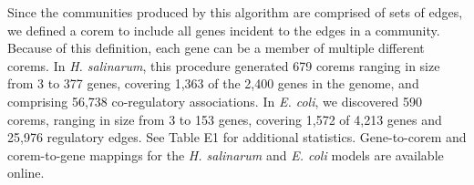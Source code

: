 Since the communities produced by this algorithm are comprised of sets
of edges, we defined a corem to include all genes incident to the
edges in a community. Because of this definition, each gene can be a
member of multiple different corems. In {\it H. salinarum}, this procedure
generated 679 corems ranging in size from 3 to 377 genes, covering
1,363 of the 2,400 genes in the genome, and comprising 56,738
co-regulatory associations. In {\it E. coli}, we discovered 590 corems,
ranging in size from 3 to 153 genes, covering 1,572 of 4,213 genes and
25,976 regulatory edges. See Table E1 for additional
statistics. Gene-to-corem and corem-to-gene mappings for the
{\it H. salinarum} and {\it E. coli} models are available online.
